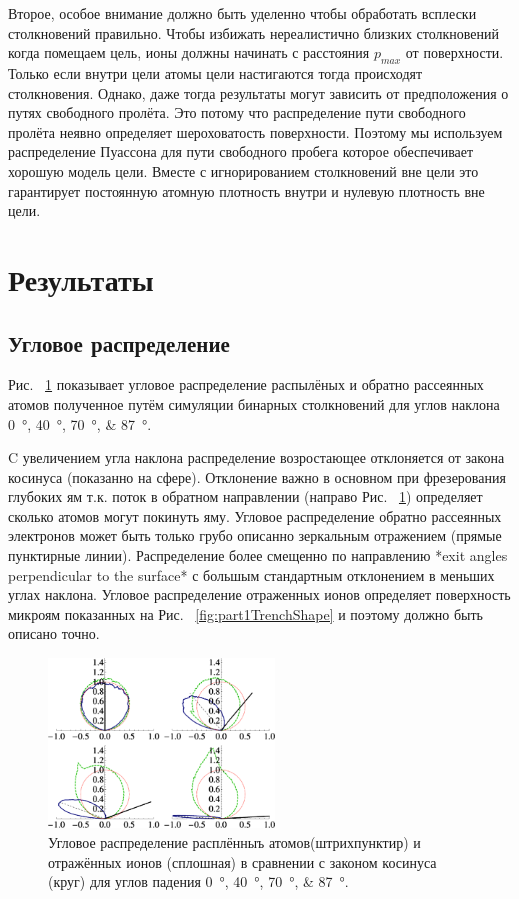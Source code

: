 \documentclass[a4paper,fontsize=12pt]{article}
\begin{document}
Второе, особое внимание должно быть уделенно чтобы обработать всплески столкновений правильно. Чтобы избижать нереалистично близких столкновений когда помещаем цель, ионы должны начинать с расстояния $p_{max}$ от поверхности. Только если внутри цели атомы цели настигаются тогда происходят столкновения. Однако, даже тогда результаты могут зависить от предположения о путях свободного пролёта. Это потому что распределение пути свободного пролёта неявно определяет шероховатость поверхности. Поэтому мы используем распределение Пуассона для пути свободного пробега которое обеспечивает хорошую модель цели. Вместе с игнорированием столкновений вне цели это гарантирует постоянную атомную плотность внутри и нулевую плотность вне цели.

\section{Результаты}
\subsection{Угловое распределение}

Рис. ~\ref{fig:part1AngualarDistribution} показывает угловое распределение распылёных и обратно рассеянных атомов полученное путём симуляции бинарных столкновений для углов наклона \SIlist{0;40;70;87}{\degree}.

C увеличением угла наклона распределение возростающее отклоняется от закона косинуса (показанно на сфере). Отклонение важно в основном при фрезерования глубоких ям т.к. поток в обратном направлении (направо Рис. ~\ref{fig:part1AngualarDistribution}) определяет сколько атомов могут покинуть яму.
Угловое распределение обратно рассеянных электронов может быть только грубо описанно зеркальным отражением (прямые пунктирные линии). Распределение более смещенно по направлению *exit angles perpendicular to the surface* с большым стандартным отклонением в меньших углах наклона. Угловое распределение отраженных ионов определяет поверхность микроям показанных на Рис. ~\ref{fig:part1TrenchShape} и поэтому должно быть описано точно.

\begin{figure}[h]
    \centering
    \includegraphics[width=6cm]{images/part1/2.eps}
    \caption{Угловое распределение расплённыъ атомов(штрихпунктир) и отражённых ионов (сплошная) в сравнении с законом косинуса (круг) для углов падения \SIlist{0;40;70;87}{\degree}.}
    \label{fig:part1AngualarDistribution}
\end{figure}
\end{document}
